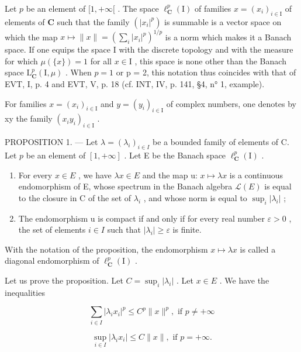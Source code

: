 Let \(p\) be an element of \([1, +\infty[\) . The space \(\ell_{\mathbf{C}}^{p}(\mathrm{I})\) of families \(x = (x_{i})_{i \in \mathrm{I}}\) of elements of \(\mathbf{C}\) such that the family \((|x_{i}|^{p})\) is summable is a vector space on which the map \(x \mapsto \| x \| = (\sum_{i} |x_{i}|^{p})^{1/p}\) is a norm which makes it a Banach space. If one equips the space I with the discrete topology and with the measure for which \(\mu(\{x\}) = 1\) for all \(x \in \mathrm{I}\) , this space is none other than the Banach space \(\mathrm{L}_{\mathbf{C}}^{p}(\mathrm{I}, \mu)\) . When \(p = 1\) or p = 2, this notation thus coincides with that of EVT, I, p. 4 and EVT, V, p. 18 (cf. INT, IV, p. 141, §4, n° 1, example).

For families \(x = (x_{i})_{i \in \mathrm{I}}\) and \(y = (y_{i})_{i \in \mathrm{I}}\) of complex numbers, one denotes by xy the family \((x_{i}y_{i})_{i \in \mathrm{I}}\) .

PROPOSITION 1. --- Let \(\lambda = (\lambda_i)_{i\in I}\) be a bounded family of elements of C. Let \(p\) be an element of \([1, +\infty]\) . Let E be the Banach space \(\ell_{\mathbf{C}}^p (\mathrm{I})\) .

\begin{enumerate}
\def\labelenumi{\alph{enumi})}
\item
  For every \(x \in E\) , we have \(\lambda x \in E\) and the map u: \(x \mapsto \lambda x\) is a continuous endomorphism of E, whose spectrum in the Banach algebra \(\mathcal{L}(E)\) is equal to the closure in C of the set of \(\lambda_{i}\) , and whose norm is equal to \(\sup_{i} |\lambda_{i}|\) ;
\item
  The endomorphism u is compact if and only if for every real number \(\varepsilon > 0\) , the set of elements \(i \in I\) such that \(|\lambda_{i}| \geqslant \varepsilon\) is finite.
\end{enumerate}

With the notation of the proposition, the endomorphism \(x \mapsto \lambda x\) is called a diagonal endomorphism of \(\ell_{\mathbf{C}}^{p}(\mathrm{I})\) .

Let us prove the proposition. Let \(C = \sup_{i} |\lambda_{i}|\) . Let \(x \in E\) . We have the inequalities

\[
\sum_ {i \in I} | \lambda_ {i} x _ {i} | ^ {p} \leqslant C ^ {p} \| x \| ^ {p}, \text {   if   } p \neq + \infty
\]

\[
\sup _ {i \in I} | \lambda_ {i} x _ {i} | \leqslant C \| x \|, \text {   if   } p = + \infty .
\]


